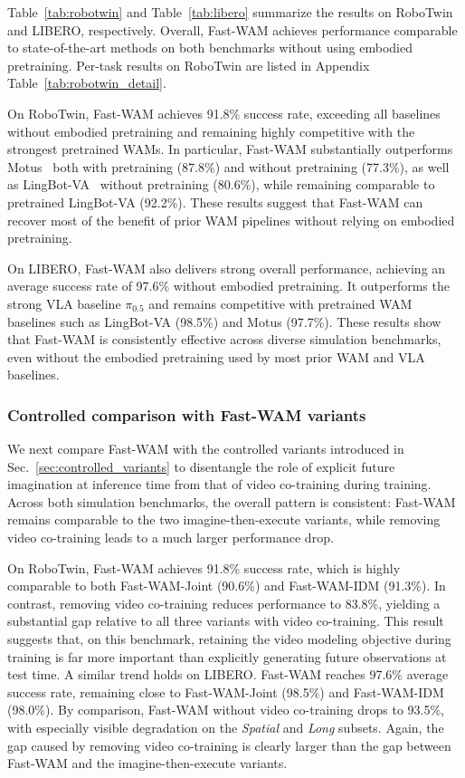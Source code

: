 


Table~\ref{tab:robotwin} and Table~\ref{tab:libero} summarize the results on RoboTwin and LIBERO, respectively. Overall, Fast-WAM achieves performance comparable to state-of-the-art methods on both benchmarks without using embodied pretraining. Per-task results on RoboTwin are listed in Appendix Table~\ref{tab:robotwin_detail}.

On RoboTwin, Fast-WAM achieves 91.8\% success rate, exceeding all baselines without embodied pretraining and remaining highly competitive with the strongest pretrained WAMs. In particular, Fast-WAM substantially outperforms Motus~\cite{bi2025motusunifiedlatentaction} both with pretraining (87.8\%) and without pretraining (77.3\%), as well as LingBot-VA~\cite{lingbot-va2026} without pretraining (80.6\%), while remaining comparable to pretrained LingBot-VA (92.2\%). These results suggest that Fast-WAM can recover most of the benefit of prior WAM pipelines without relying on embodied pretraining.

On LIBERO, Fast-WAM also delivers strong overall performance, achieving an average success rate of 97.6\% without embodied pretraining. It outperforms the strong VLA baseline $\pi_{0.5}$ and remains competitive with pretrained WAM baselines such as LingBot-VA (98.5\%) and Motus (97.7\%). These results show that Fast-WAM is consistently effective across diverse simulation benchmarks, even without the embodied pretraining used by most prior WAM and VLA baselines.

\subsubsection{Controlled comparison with Fast-WAM variants}

We next compare Fast-WAM with the controlled variants introduced in Sec.~\ref{sec:controlled_variants} to disentangle the role of explicit future imagination at inference time from that of video co-training during training. Across both simulation benchmarks, the overall pattern is consistent: Fast-WAM remains comparable to the two imagine-then-execute variants, while removing video co-training leads to a much larger performance drop.

On RoboTwin, Fast-WAM achieves 91.8\% success rate, which is highly comparable to both Fast-WAM-Joint (90.6\%) and Fast-WAM-IDM (91.3\%). In contrast, removing video co-training reduces performance to 83.8\%, yielding a substantial gap relative to all three variants with video co-training. This result suggests that, on this benchmark, retaining the video modeling objective during training is far more important than explicitly generating future observations at test time. A similar trend holds on LIBERO. Fast-WAM reaches 97.6\% average success rate, remaining close to Fast-WAM-Joint (98.5\%) and Fast-WAM-IDM (98.0\%). By comparison, Fast-WAM without video co-training drops to 93.5\%, with especially visible degradation on the \textit{Spatial} and \textit{Long} subsets. Again, the gap caused by removing video co-training is clearly larger than the gap between Fast-WAM and the imagine-then-execute variants.


